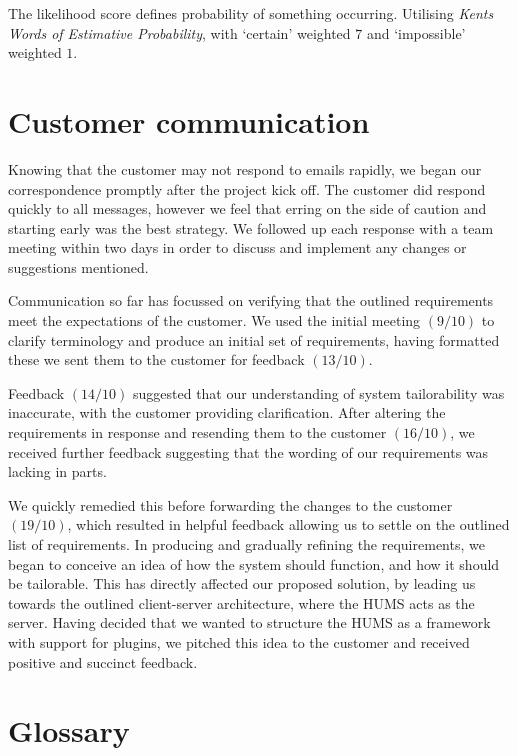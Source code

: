 \documentclass[10pt,a4paper]{article}
\begin{document}


The likelihood score defines probability of something occurring. Utilising
\textit{Kents Words of Estimative Probability}\cite{kent1966strategic}, with
`certain' weighted $7$ and `impossible' weighted $1$.






\section{Customer communication}

Knowing that the customer may not respond to emails rapidly, we began our
correspondence promptly after the project kick off. The customer did
respond quickly to all messages, however we feel that erring on the side of
caution and starting early was the best strategy. We followed up each response
with a team meeting within two days in order to discuss and implement any
changes or suggestions mentioned.

Communication so far has focussed on verifying that the outlined requirements
meet the expectations of the customer. We used the initial meeting $(9/10)$ to
clarify terminology and produce an initial set of requirements,  having
formatted these we sent them to the customer for feedback $(13/10)$.

Feedback $(14/10)$ suggested that our understanding of system tailorability was
inaccurate, with the customer providing clarification. After altering the
requirements in response and resending them to the customer $(16/10)$, we received
further feedback suggesting that the wording of our requirements was lacking in
parts.

We quickly remedied this before forwarding the changes to the customer $(19/10)$,
which resulted in helpful feedback allowing us to settle on the outlined list
of requirements. In producing and gradually refining the requirements, we began
to conceive an idea of how the system should function, and how it should be
tailorable. This has directly affected our proposed solution, by leading us
towards the outlined client-server architecture, where the HUMS acts as the
server. Having decided that we wanted to structure the HUMS as a framework with
support for plugins, we pitched this idea to the customer and received positive
and succinct feedback.

\section{Glossary}
\end{document}
